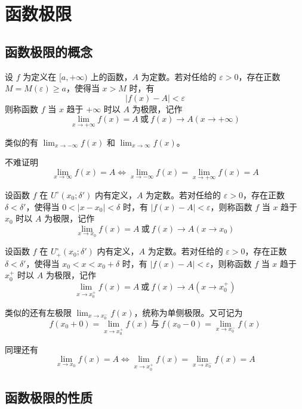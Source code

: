 \chapter{函数极限}

\section{函数极限的概念}

\begin{definition}
	设 $f$ 为定义在 $[a,+\infty)$ 上的函数，$A$ 为定数。若对任给的 $\varepsilon>0$，存在正数 $M=M(\varepsilon) \geqslant a$，使得当 $x>M$ 时，有
	$$|f(x)-A| < \varepsilon$$
	则称函数 $f$ 当 $x$ 趋于 $+\infty$ 时以 $A$ 为极限，记作
	$$\lim_{x\to +\infty}f(x) = A\ \text{或}\ f(x) \to A(x\to +\infty)$$
\end{definition}

类似的有 $\lim_{x\to -\infty}f(x)$ 和 $\lim_{x\to \infty}f(x)$。

不难证明
$$\lim_{x \to \infty}f(x) = A \Leftrightarrow \lim_{x \to -\infty}f(x)=\lim_{x \to +\infty}f(x)=A$$

\begin{definition}
	设函数 $f$ 在 $U^\circ(x_0;\delta')$ 内有定义，$A$ 为定数。若对任给的 $\varepsilon>0$，存在正数 $\delta<\delta'$，使得当 $0<|x-x_0|<\delta$ 时，有 $|f(x)-A|<\varepsilon$，则称函数 $f$ 当 $x$ 趋于 $x_0$ 时以 $A$ 为极限，记作
	$$\lim_{x\to x_0}f(x) = A\ \text{或}\ f(x)\to A(x\to x_0)$$
\end{definition}

\begin{definition}
	设函数 $f$ 在 $U_+^\circ(x_0;\delta')$ 内有定义，$A$ 为定数。若对任给的 $\varepsilon>0$，存在正数 $\delta<\delta'$，使得当 $x_0<x<x_0+\delta$ 时，有 $|f(x)-A|<\varepsilon$，则称函数 $f$ 当 $x$ 趋于 $x_0^+$ 时以 $A$ 为极限，记作 
	$$\lim_{x\to x_0^+}f(x) = A\ \text{或}\ f(x)\to A(x\to x_0^+)$$
\end{definition}

类似的还有左极限 $\displaystyle\lim_{x\to x_0^-}f(x)$，统称为单侧极限。又可记为
$$f(x_0+0) = \lim_{x\to x_0^+}f(x)\ \text{与}\ f(x_0-0) = \lim_{x\to x_0^-}f(x)$$

同理还有
$$\lim_{x \to x_0}f(x) = A \Leftrightarrow \lim_{x \to x_0^+}f(x)=\lim_{x \to x_0^-}f(x)=A$$

\section{函数极限的性质}

